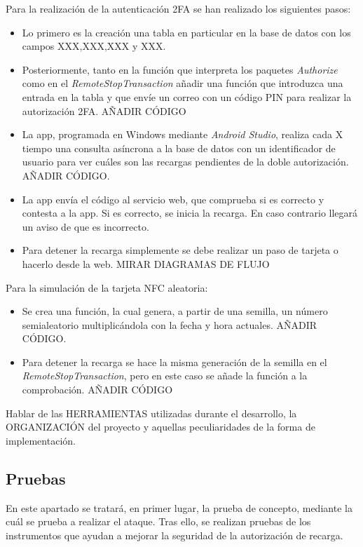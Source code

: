 \documentclass[12pt,a4paper,onecolumn,oneside]{report}
\begin{document}
Para la realización de la autenticación 2FA se han realizado los siguientes pasos:
\begin{itemize}
\item Lo primero es la creación una tabla en particular en la base de datos con los campos XXX,XXX,XXX y XXX.
\item Posteriormente, tanto en la función que interpreta los paquetes \textit{Authorize} como en el \textit{RemoteStopTransaction} añadir una función que introduzca una entrada en la tabla y que envíe un correo con un código PIN para realizar la autorización 2FA.
AÑADIR CÓDIGO
\item La app, programada en Windows mediante \textit{Android Studio}, realiza cada X tiempo una consulta asíncrona a la base de datos con un identificador de usuario para ver cuáles son las recargas pendientes de la doble autorización.
AÑADIR CÓDIGO.
\item La app envía el código al servicio web, que comprueba si es correcto y contesta a la app. Si es correcto, se inicia la recarga. En caso contrario llegará un aviso de que es incorrecto.
\item Para detener la recarga simplemente se debe realizar un paso de tarjeta o hacerlo desde la web.
MIRAR DIAGRAMAS DE FLUJO
\end{itemize}

Para la simulación de la tarjeta NFC aleatoria:
\begin{itemize}
\item Se crea una función, la cual genera, a partir de una semilla, un número semialeatorio multiplicándola con la fecha y hora actuales.
AÑADIR CÓDIGO.
\item Para detener la recarga se hace la misma generación de la semilla en el \textit{RemoteStopTransaction}, pero en este caso se añade la función a la comprobación.
AÑADIR CÓDIGO
\end{itemize}


Hablar de las HERRAMIENTAS utilizadas durante el desarrollo, la ORGANIZACIÓN del proyecto y aquellas peculiaridades de la forma de implementación.







\subsection{Pruebas}

En este apartado se tratará, en primer lugar, la prueba de concepto, mediante la cuál se prueba a realizar el ataque. Tras ello, se realizan pruebas de los instrumentos que ayudan a mejorar la seguridad de la autorización de recarga.
\end{document}
